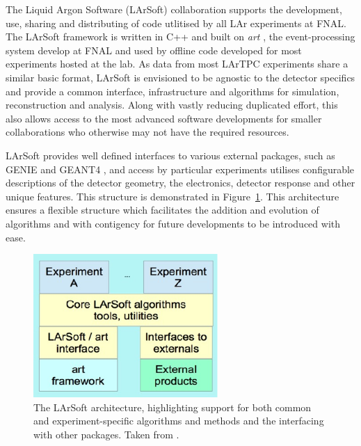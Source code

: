 The Liquid Argon Software (LArSoft) \cite{LArSoftWebsite,LArSoft2013,LArSoft2016,Snider2016} collaboration supports the development, use, sharing and distributing of code utlitised by all LAr experiments at FNAL.  The LArSoft framework is written in C++ and built on \textit{art} \cite{artWebsite,art2012}, the event-processing system develop at FNAL and used by offline code developed for most experiments hosted at the lab.  As data from most LArTPC experiments share a similar basic format, LArSoft is envisioned to be agnostic to the detector specifics and provide a common interface, infrastructure and algorithms for simulation, reconstruction and analysis.  Along with vastly reducing duplicated effort, this also allows access to the most advanced software developments for smaller collaborations who otherwise may not have the required resources.

LArSoft provides well defined interfaces to various external packages, such as GENIE \cite{GENIE2010} and GEANT4 \cite{GEANT42006}, and access by particular experiments utilises configurable descriptions of the detector geometry, the electronics, detector response and other unique features.  This structure is demonstrated in Figure~\ref{fig:LArSoftStructure}.  This architecture ensures a flexible structure which facilitates the addition and evolution of algorithms and with contigency for future developments to be introduced with ease.

\begin{figure}
  \centering
  \includegraphics[width=7cm]{LArSoftStructure.pdf}
  \caption[The LArSoft architecture, highlighting support for both common and experiment-specific algorithms and methods and the interfacing with other packages.]{The LArSoft architecture, highlighting support for both common and experiment-specific algorithms and methods and the interfacing with other packages.  Taken from \cite{LArSoft2016}.}
  \label{fig:LArSoftStructure}
\end{figure}

